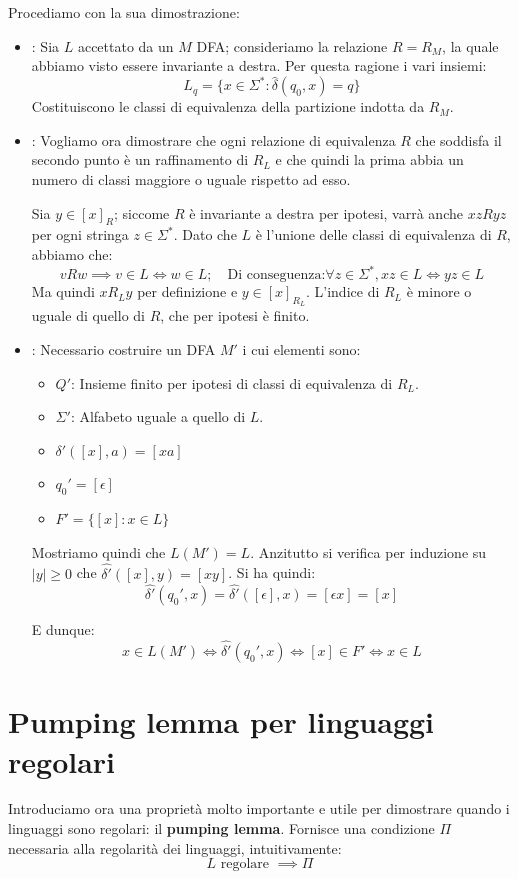 \noindent Procediamo con la sua dimostrazione: \begin{itemize}
    \item [$1\to 2$]: Sia $L$ accettato da un $M$ DFA; consideriamo la relazione $R = R_M$, la quale abbiamo visto essere invariante a destra. Per
    questa ragione i vari insiemi: \[
        L_q = \{x\in \Sigma^* : \hat{\delta}(q_0, x) = q\}
    \]
    \noindent Costituiscono le classi di equivalenza della partizione indotta da $R_M$.
    \item [$2\to 3$]: Vogliamo ora dimostrare che ogni relazione di equivalenza $R$ che soddisfa il secondo punto è un raffinamento di $R_L$ e che
    quindi la prima abbia un numero di classi maggiore o uguale rispetto ad esso.\par
    Sia $y\in [x]_R$; siccome $R$ è invariante a destra per ipotesi, varrà anche $xz R yz$ per ogni stringa $z\in \Sigma^*$. Dato che $L$ è l'unione
    delle classi di equivalenza di $R$, abbiamo che: \[
        vRw \implies v\in L \iff w\in L;\quad\text{Di conseguenza:} \forall z\in \Sigma^*, xz\in L \iff yz\in L
    \]
    \noindent Ma quindi $xR_L y$ per definizione e $y\in [x]_{R_L}$. L'indice di $R_L$ è minore o uguale di quello di $R$, che per ipotesi è finito.
    \item [$3\to 1$]: Necessario costruire un DFA $M'$ i cui elementi sono: \begin{itemize}
        \item $Q'$: Insieme finito per ipotesi di classi di equivalenza di $R_L$.
        \item $\Sigma'$: Alfabeto uguale a quello di $L$.
        \item $\delta'([x], a) = [xa]$
        \item $q_0' = [\epsilon]$
        \item $F' = \{[x] : x\in L\}$
    \end{itemize}

    \noindent Mostriamo quindi che $L(M') = L$. Anzitutto si verifica per induzione su $|y| \geq 0$ che $\hat{\delta'}([x], y) = [xy]$. Si ha quindi: \[
        \hat{\delta'}(q_0', x) = \hat{\delta'}([\epsilon], x) = [\epsilon x] = [x]
    \]

    \noindent E dunque: \[
        x\in L(M') \iff \hat{\delta'}(q_0', x) \iff [x]\in F' \iff x\in L
    \]
\end{itemize}

%

\section{Pumping lemma per linguaggi regolari}
Introduciamo ora una proprietà molto importante e utile per dimostrare quando i linguaggi sono regolari: il \textbf{pumping lemma}. Fornisce una
condizione $\Pi$ necessaria alla regolarità dei linguaggi, intuitivamente: \[
    L \text{ regolare } \implies \Pi
\]

